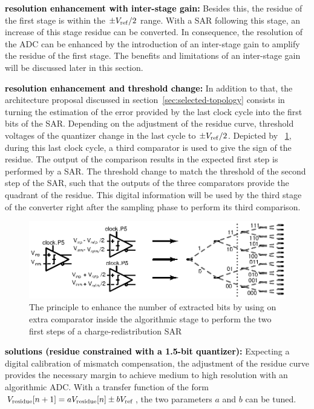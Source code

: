 \textbf{\textcolor{black}{resolution enhancement with inter-stage gain:}}
Besides this, the residue of the first stage is within the $\pm V_{\rm ref}/2$ range. With a SAR following this stage, an increase of this stage residue can be converted. In consequence, the resolution of the ADC can be enhanced by the introduction of an inter-stage gain to amplify the residue of the first stage. The benefits and limitations of an inter-stage gain will be discussed later in this section.

\textbf{\textcolor{black}{resolution enhancement and threshold change:}}
In addition to that, the architecture proposal discussed in section~\ref{sec:selected-topology} consists in turning the estimation of the error provided by the last clock cycle into the first bits of the SAR. Depending on the adjustment of the residue curve, threshold voltages of the quantizer change in the last cycle to \(\pm V_{\rm ref}/2\). Depicted by \figurename~\ref{fig:sar-first-bits-from-algo}, during this last clock cycle, a third comparator is used to give the sign of the residue. The output of the comparison results in the expected first step is performed by a SAR\@. The threshold change to match the threshold of the second step of the SAR, such that the outputs of the three comparators provide the quadrant of the residue. This digital information will be used by the third stage of the converter right after the sampling phase to perform its third comparison.

\begin{figure}[htp]
	\centering
	\includegraphics[width=\textwidth]{Chapter4/Figs/algo_sar_first_bits.ps}
	\caption{The principle to enhance the number of extracted bits by using on extra comparator inside the algorithmic stage to perform the two first steps of a charge-redistribution SAR}
	\label{fig:sar-first-bits-from-algo}
\end{figure}

\textbf{\textcolor{black}{solutions (residue constrained with a 1.5-bit quantizer):}}
Expecting a digital calibration of mismatch compensation, the adjustment of the residue curve provides the necessary margin to achieve medium to high resolution with an algorithmic ADC\@. With a transfer function of the form $V_{\rm residue}[n+1] = a V_{\rm residue}[n] \pm b V_{\rm ref}$, the two parameters $a$ and $b$ can be tuned.

